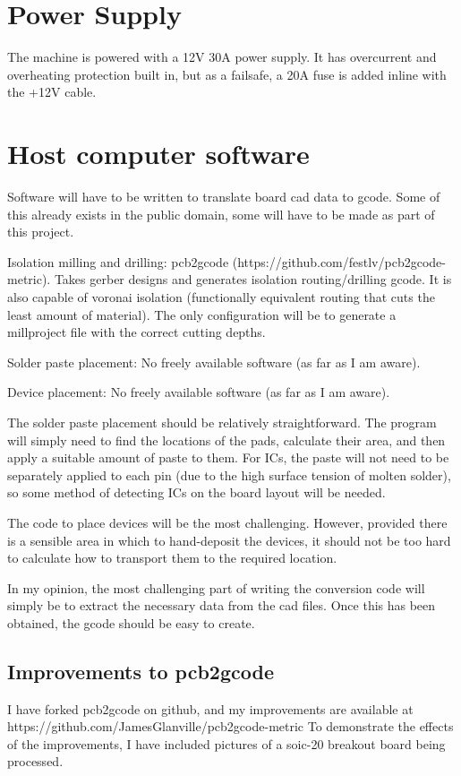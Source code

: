 \documentclass[a4paper,11pt]{article}  %
\begin{document}
\section{Power Supply}
The machine is powered with a 12V 30A power supply. It has overcurrent and overheating protection built in, but as a failsafe, a 20A fuse is added inline with the +12V cable. 

\section{Host computer software}
Software will have to be written to translate board cad data to gcode. Some of this already exists in the public domain, some will have to be made
as part of this project.

Isolation milling and drilling: pcb2gcode (https://github.com/festlv/pcb2gcode-metric). Takes gerber designs and generates isolation routing/drilling
gcode. It is also capable of voronai isolation (functionally equivalent routing that cuts the least amount of material). The only configuration
will be to generate a millproject file with the correct cutting depths.

Solder paste placement: No freely available software (as far as I am aware).

Device placement: No freely available software (as far as I am aware).

The solder paste placement should be relatively straightforward. The program will simply need to find the locations of the pads, calculate their
area, and then apply a suitable amount of paste to them. For ICs, the paste will not need to be separately applied to each pin (due to the high
surface tension of molten solder), so some method of detecting ICs on the board layout will be needed.

The code to place devices will be the most challenging. However, provided there is a sensible area in which to hand-deposit the devices, it should
not be too hard to calculate how to transport them to the required location.

In my opinion, the most challenging part of writing the conversion code will simply be to extract the necessary data from the cad files. Once this
has been obtained, the gcode should be easy to create.

\subsection{Improvements to pcb2gcode}
I have forked pcb2gcode on github, and my improvements are available at https://github.com/JamesGlanville/pcb2gcode-metric
To demonstrate the effects of the improvements, I have included pictures of a soic-20 breakout board being processed.
\end{document}
